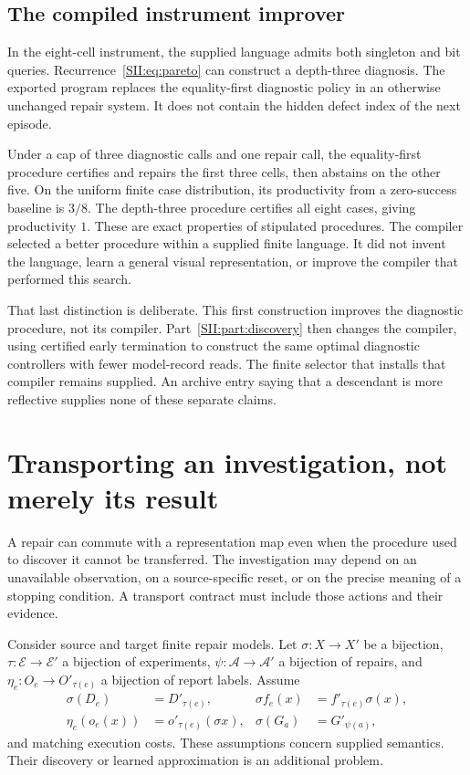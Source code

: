 \subsection{The compiled instrument improver}
In the eight-cell instrument, the supplied language admits both singleton and bit queries. Recurrence~\eqref{SII:eq:pareto} can construct a depth-three diagnosis. The exported program replaces the equality-first diagnostic policy in an otherwise unchanged repair system. It does not contain the hidden defect index of the next episode.

Under a cap of three diagnostic calls and one repair call, the equality-first procedure certifies and repairs the first three cells, then abstains on the other five. On the uniform finite case distribution, its productivity from a zero-success baseline is $3/8$. The depth-three procedure certifies all eight cases, giving productivity $1$. These are exact properties of stipulated procedures. The compiler selected a better procedure within a supplied finite language. It did not invent the language, learn a general visual representation, or improve the compiler that performed this search.

That last distinction is deliberate. This first construction improves the diagnostic procedure, not its compiler. Part~\ref{SII:part:discovery} then changes the compiler, using certified early termination to construct the same optimal diagnostic controllers with fewer model-record reads. The finite selector that installs that compiler remains supplied. An archive entry saying that a descendant is more reflective supplies none of these separate claims.

\section{Transporting an investigation, not merely its result}\label{SII:sec:transport}
A repair can commute with a representation map even when the procedure used to discover it cannot be transferred. The investigation may depend on an unavailable observation, on a source-specific reset, or on the precise meaning of a stopping condition. A transport contract must include those actions and their evidence.

Consider source and target finite repair models. Let $\sigma:X\to X'$ be a bijection, $\tau:\mathcal E\to\mathcal E'$ a bijection of experiments, $\psi:\mathcal A\to\mathcal A'$ a bijection of repairs, and $\eta_e:O_e\to O'_{\tau(e)}$ a bijection of report labels. Assume
\begin{align}\label{SII:eq:transport}
\sigma(D_e)&=D'_{\tau(e)}, &
\sigma f_e(x)&=f'_{\tau(e)}\sigma(x),\\
\eta_e(o_e(x))&=o'_{\tau(e)}(\sigma x), &
\sigma(G_a)&=G'_{\psi(a)},\nonumber
\end{align}
and matching execution costs. These assumptions concern supplied semantics. Their discovery or learned approximation is an additional problem.

